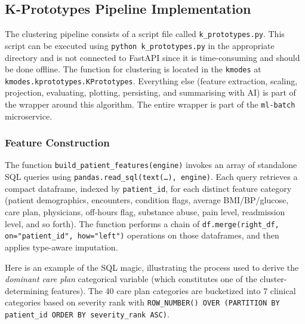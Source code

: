 \subsection{K-Prototypes Pipeline Implementation}

The clustering pipeline consists of a script file called \texttt{k\_prototypes.py}. This script can be executed using \texttt{python k\_prototypes.py} in the appropriate directory and is not connected to FastAPI since it is time-consuming and should be done offline. The function for clustering is located in the \texttt{kmodes} at \texttt{kmodes.kprototypes.KPrototypes}. Everything else (feature extraction, scaling, projection, evaluating, plotting, persisting, and summarising with AI) is part of the wrapper around this algorithm. The entire wrapper is part of the \texttt{ml-batch} microservice.

\subsubsection*{Feature Construction}
\label{ch:feature_construction}

The function \texttt{build\_patient\_features(engine)} invokes an array of standalone SQL queries using \texttt{pandas.read\_sql(text(\dots), engine)}. Each query retrieves a compact dataframe, indexed by \texttt{patient\_id}, for each distinct feature category (patient demographics, encounters, condition flags, average BMI/BP/glucose, care plan, physicians, off-hours flag, substance abuse, pain level, readmission level, and so forth). The function performs a chain of \texttt{df.merge(right\_df, on="patient\_id", how="left")} operations on those dataframes, and then applies type-aware imputation.

Here is an example of the SQL magic, illustrating the process used to derive the \emph{dominant care plan} categorical variable (which constitutes one of the cluster-determining features). The 40 care plan categories are bucketized into 7 clinical categories based on severity rank with \texttt{ROW\_NUMBER() OVER (PARTITION BY patient\_id ORDER BY severity\_rank ASC)}.

